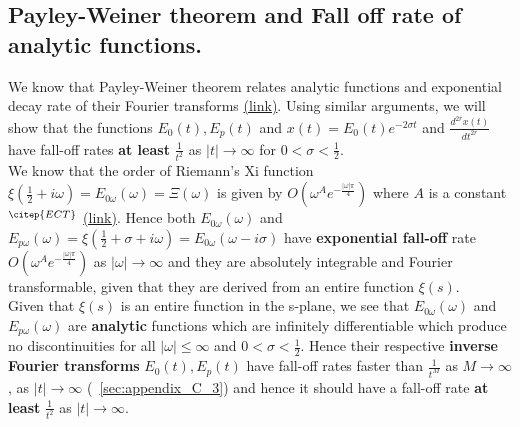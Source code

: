 \documentclass[11pt]{elsarticle}
\begin{document}

\subsection{\label{sec:appendix_C_5} \textbf{ Payley-Weiner theorem and Fall off rate of analytic functions. } \protect\\  \lowercase{} }

We know that Payley-Weiner theorem relates analytic functions and exponential decay rate of their Fourier transforms \href{http://cosweb1.fau.edu/~jmirelesjames/ODE_course/Complex_Analysis.pdf#page=140}{(link)}. Using similar arguments, we will show that the functions $E_0(t), E_p(t)$ and $x(t)=E_0(t) e^{-2 \sigma t}$ and $\frac{d^{2r}x(t)}{dt^{2r}}$ have  fall-off rates \textbf{at least} $\frac{1}{t^2}$ as $|t| \to \infty$ for $0 < \sigma < \frac{1}{2}$.\\

We know that the order of Riemann's Xi function $\xi(\frac{1}{2} + i \omega) = E_{0\omega}(\omega) = \Xi(\omega)$ is given by $O(\omega^A e^{-\frac{|\omega|\pi}{4}})$ where $A$ is a constant$^{\citep{ECT}}$ \href{https://www.ocf.berkeley.edu/~araman/files/math_z/titchmarsh_p2.png}{(link)}. Hence both $E_{0\omega}(\omega)$ and $E_{p\omega}(\omega)= \xi(\frac{1}{2} + \sigma + i \omega) = E_{0\omega}(\omega - i \sigma)$ have \textbf{exponential fall-off} rate $O(\omega^A e^{-\frac{|\omega|\pi}{4}})$ as $|\omega| \to \infty$ and they are absolutely integrable and Fourier transformable, given that they are derived from an entire function $\xi(s)$.\\

Given that $\xi(s)$ is an entire function in the s-plane, we see that $E_{0\omega}(\omega)$ and $E_{p\omega}(\omega)$ are \textbf{analytic} functions which are infinitely differentiable which produce no discontinuities for all $|\omega| \leq \infty$ and $0 < \sigma < \frac{1}{2}$. Hence their respective \textbf{inverse Fourier transforms} $E_0(t), E_p(t)$ have fall-off rates faster than $\frac{1}{t^M}$ as $M \to \infty$, as $|t| \to \infty$ (~\ref{sec:appendix_C_3})  and hence it should have a fall-off rate \textbf{at least} $\frac{1}{t^2}$ as $|t| \to \infty$.\\
\end{document}
